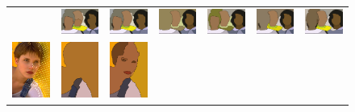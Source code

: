 \begin{figure}
\begin{center}
\begin{tabular}{ c  c  c  c  c  c  c }
&\includegraphics[width=2cm]{fig/visual_result/visual_result_5_2.png}
&\includegraphics[width=2cm]{fig/visual_result/visual_result_5_3.png}
&\includegraphics[width=2cm]{fig/visual_result/visual_result_5_4.png}
&\includegraphics[width=2cm]{fig/visual_result/visual_result_5_5.png}
&\includegraphics[width=2cm]{fig/visual_result/visual_result_5_6.png}
&\includegraphics[width=2cm]{fig/visual_result/visual_result_5_7.png}
\\
\includegraphics[width=2cm]{fig/visual_result/visual_result_6_1.png}
&\includegraphics[width=2cm]{fig/visual_result/visual_result_6_2.png}
&\includegraphics[width=2cm]{fig/visual_result/visual_result_6_3.png}

\end{tabular}
\end{center}
\end{figure}
